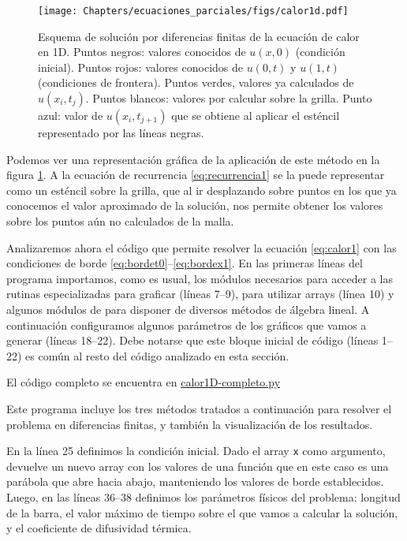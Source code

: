 \begin{figure}[t]
 \centering
 \texttt{[image: Chapters/ecuaciones\_parciales/figs/calor1d.pdf]}
 \caption{Esquema de solución por diferencias finitas de la ecuación de calor en 1D. Puntos negros: valores conocidos de $u(x, 0)$ (condición inicial). Puntos rojos: valores conocidos de $u(0, t)$ y $u(1, t)$ (condiciones de frontera). Puntos verdes, valores ya calculados de $u(x_i, t_j)$. Puntos blancos: valores por calcular sobre la grilla. Punto azul: valor de $u(x_i, t_{j+1})$ que se obtiene al aplicar el esténcil representado por las líneas negras.}
 \label{fig:calor1d}
\end{figure}


Podemos ver una representación gráfica de la aplicación de este método en la figura \ref{fig:calor1d}. A la ecuación de recurrencia \eqref{eq:recurrencia1} se la puede representar como un esténcil sobre la grilla, que al ir desplazando sobre puntos en los que ya conocemos el valor aproximado de la solución, nos permite obtener los valores sobre los puntos aún no calculados de la malla.

Analizaremos ahora el código que permite resolver la ecuación \eqref{eq:calor1} con las condiciones de borde \eqref{eq:bordet0}--\eqref{eq:bordex1}. En las primeras líneas del programa importamos, como es usual, los módulos necesarios para acceder a las rutinas especializadas para graficar (líneas 7--9),  para utilizar arrays (línea 10) y algunos módulos de  para disponer de diversos métodos de álgebra lineal. A continuación configuramos algunos parámetros de los gráficos que vamos a generar (líneas 18--22). Debe notarse que este bloque inicial de código (líneas 1--22) es común al resto del código analizado en esta sección.

\begin{github}
 El código completo se encuentra en \href{https://github.com/algunaurl/calor1D-completo.py}{calor1D-completo.py}
 
 \noindent Este programa incluye los tres métodos tratados a continuación para resolver el problema en diferencias finitas, y también la visualización de los resultados.
\end{github}


En la línea 25 definimos la condición inicial. Dado el array \verb|x| como argumento, devuelve un nuevo array con los valores de una función que en este caso es una parábola que abre hacia abajo, manteniendo los valores de borde establecidos. Luego, en las líneas 36--38 definimos los parámetros físicos del problema: longitud de la barra, el valor máximo de tiempo sobre el que vamos a calcular la solución, y el coeficiente de difusividad térmica.

